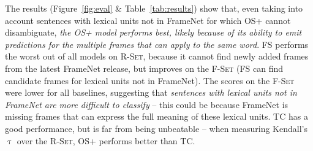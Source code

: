\begin{table}[t!]
    \centering
    \caption{Aggregated evaluation results.}
    \label{tab:results}
\end{table}

The results (Figure~\ref{fig:eval} \& Table~\ref{tab:results}) show that, even taking into account sentences with lexical units not in FrameNet for which OS+ cannot disambiguate, \emph{the OS+ model performs best, likely because of its ability to emit predictions for the multiple frames that can apply to the same word}. FS performs the worst out of all models on \textsc{R-Set}, because it cannot find newly added frames from the latest FrameNet release, but improves on the \textsc{F-Set} (FS can find candidate frames for lexical units not in FrameNet). The scores on the \textsc{F-Set} were lower for all baselines, suggesting that \emph{sentences with lexical units not in FrameNet are more difficult to classify} -- this could be because FrameNet is missing frames that can express the full meaning of these lexical units. TC has a good performance, but is far from being unbeatable -- when measuring Kendall's $\uptau$ over the \textsc{R-Set}, OS+ performs better than TC.



